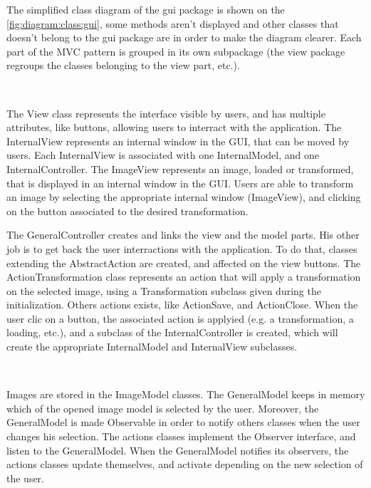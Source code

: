 The simplified class diagram of the gui package is shown on the \vref{fig:diagram:class:gui}, some methods aren't displayed and other classes that doesn't belong to the gui package are in order to make the diagram clearer. Each part of the \gls{MVC} pattern is grouped in its own subpackage (the view package regroups the classes belonging to the view part, etc.). 

~~

The View class represents the interface visible by users, and has multiple attributes, like buttons, allowing users to interract with the application. The InternalView represents an internal window in the \gls{GUI}, that can be moved by users. Each InternalView is associated with one InternalModel, and one InternalController. The ImageView represents an image, loaded or transformed, that is displayed in an internal window in the \gls{GUI}. Users are able to transform an image by selecting the appropriate internal window (ImageView), and clicking on the button associated to the desired transformation. 


The GeneralController creates and links the view and the model parts. His other job is to get back the user interractions with the application. To do that, classes extending the AbstractAction are created, and affected on the view buttons. The ActionTransformation class represents an action that will apply a transformation on the selected image, using a Transformation subclass given during the initialization. Others actions exists, like ActionSave, and ActionClose. When the user clic on a button, the associated action is applyied (e.g. a transformation, a loading, etc.), and a subclass of the InternalController is created, which will create the appropriate InternalModel and InternalView subclasses.

~~

Images are stored in the ImageModel classes. The GeneralModel keeps in memory which of the opened image model is selected by the user. Moreover, the GeneralModel is made Observable in order to notify others classes when the user changes his selection. The actions classes implement the Observer interface, and listen to the GeneralModel. When the GeneralModel notifies its observers, the actions classes update themselves, and activate depending on the new selection of the user. 



